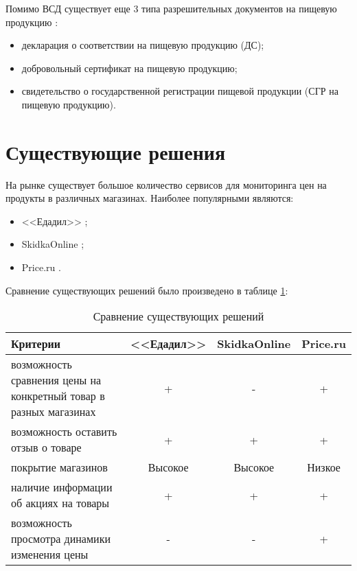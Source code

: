 Помимо ВСД существует еще 3 типа разрешительных документов на пищевую продукцию \cite{info_certificates}: 

\begin{itemize}[label*=--]
	\item декларация о соответствии на пищевую продукцию (ДС);
	\item добровольный сертификат на пищевую продукцию;
	\item свидетельство о государственной регистрации пищевой продукции (СГР на пищевую продукцию).
\end{itemize}

\clearpage

\section{Существующие решения}

На рынке существует большое количество сервисов для мониторинга цен на продукты в различных магазинах. Наиболее популярными являются:

\begin{itemize}[label=--]
	\item <<Едадил>> \cite{info_edadil};
	\item SkidkaOnline \cite{info_skidka_online};
	\item Price.ru \cite{info_price_ru}.
\end{itemize}

Сравнение существующих решений было произведено в таблице \ref{tbl:exist_sol}:

\begin{table}[ht]
	\begin{center}
		\begin{threeparttable}
			\caption{Сравнение существующих решений}
			\label{tbl:exist_sol}
			\begin{tabular}{|p{7cm}|c|c|c|}
				\hline
				\textbf{Критерии} & <<Едадил>> & SkidkaOnline & Price.ru \\
				\hline
				возможность сравнения цены на конкретный товар в разных магазинах & + & - & + \\
				\hline
				возможность оставить отзыв о товаре & + & + & + \\
				\hline
				покрытие магазинов & Высокое & Высокое & Низкое \\
				\hline
				наличие информации об акциях на товары & + & + & + \\
				\hline
				возможность просмотра динамики изменения цены & - & - & + \\
				\hline
			\end{tabular}
		\end{threeparttable}			
	\end{center}
\end{table}

